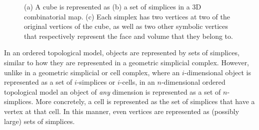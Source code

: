 \begin{figure}[tb]
\centering
{}
{}
{}
\caption[A cube represented as a 3D combinatorial map]{(a) A cube is represented as (b) a set of simplices in a 3D combinatorial map. (c) Each simplex has two vertices at two of the original vertices of the cube, as well as two other symbolic vertices that respectively represent the face and volume that they belong to.}
\label{fig:cmap-cube}
\end{figure}

In an ordered topological model, objects are represented by sets of simplices, similar to how they are represented in a geometric simplicial complex.
However, unlike in a geometric simplicial or cell complex, where an $i$-dimensional object is represented as a set of $i$-simplices or $i$-cells, in an $n$-dimensional ordered topological model an object of \emph{any} dimension is represented as a set of $n$-simplices.
More concretely, a cell is represented as the set of simplices that have a vertex at that cell.
In this manner, even vertices are represented as (possibly large) sets of simplices.

